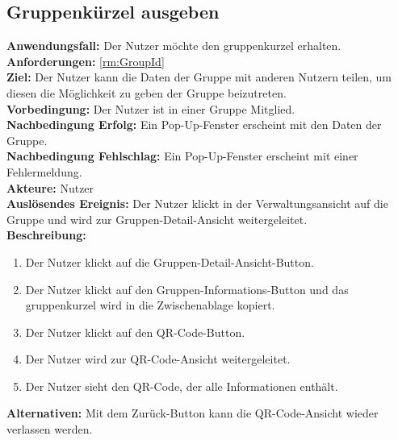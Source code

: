 \documentclass[parskip=full]{scrartcl}
\begin{document}
\subsection{Gruppenkürzel ausgeben}
\textbf{Anwendungsfall:} Der Nutzer möchte den \gls{gruppenkurzel} erhalten.\\
\textbf{Anforderungen:} \ref{rm:GroupId}\\
\textbf{Ziel:} Der Nutzer kann die Daten der Gruppe mit anderen Nutzern teilen, um diesen die Möglichkeit zu geben der Gruppe beizutreten.\\
\textbf{Vorbedingung:} Der Nutzer ist in einer Gruppe Mitglied.\\
\textbf{Nachbedingung Erfolg:} Ein Pop-Up-Fenster erscheint mit den Daten der Gruppe.\\
\textbf{Nachbedingung Fehlschlag:} Ein Pop-Up-Fenster erscheint mit einer Fehlermeldung.\\
\textbf{Akteure:} Nutzer \\
\textbf{Auslösendes Ereignis:} Der Nutzer klickt in der Verwaltungsansicht auf die Gruppe und wird zur Gruppen-Detail-Ansicht weitergeleitet.\\
\textbf{Beschreibung:}
\begin{enumerate}
    \item Der Nutzer klickt auf die Gruppen-Detail-Ansicht-Button.
    \item Der Nutzer klickt auf den Gruppen-Informations-Button und das \gls{gruppenkurzel} wird in die Zwischenablage kopiert.
    \item Der Nutzer klickt auf den QR-Code-Button.
    \item Der Nutzer wird zur QR-Code-Ansicht weitergeleitet.
    \item Der Nutzer sieht den QR-Code, der alle Informationen enthält.
\end{enumerate}
\textbf{Alternativen:} Mit dem Zurück-Button kann die QR-Code-Ansicht wieder verlassen werden.
\newpage
\end{document}
